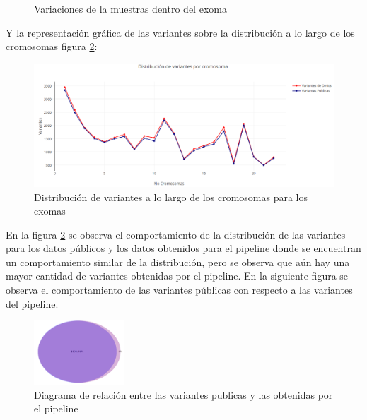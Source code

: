 \begin{figure}[H]
	\centering
	\caption{Variaciones de la muestras dentro del exoma}
	\label{f:histogramas2}
\end{figure}

Y la representación gráfica de las variantes sobre la distribución a lo largo de los cromosomas figura \ref{fig:variaciones2}:

\begin{figure}[H]
	\centering
	\includegraphics[width=1\textwidth]{Kap2/variaciones2}
	\caption{Distribución de variantes a lo largo de los cromosomas para los exomas} \label{fig:variaciones2}
\end{figure}

En la figura \ref{fig:variaciones2} se observa el comportamiento de la distribución de las variantes para los datos públicos y los datos obtenidos para el pipeline donde se encuentran un comportamiento similar de la distribución, pero se observa que aún hay una mayor cantidad de variantes obtenidas por el pipeline. En la siguiente figura se observa el comportamiento de las variantes públicas con respecto a las variantes del pipeline. 

\begin{figure}[H]
	\centering
	\includegraphics[width=0.3\textwidth]{Kap2/diagrama2}
	\caption{Diagrama de relación entre las variantes publicas y las obtenidas por el pipeline} \label{fig:diagrama2}
\end{figure}

